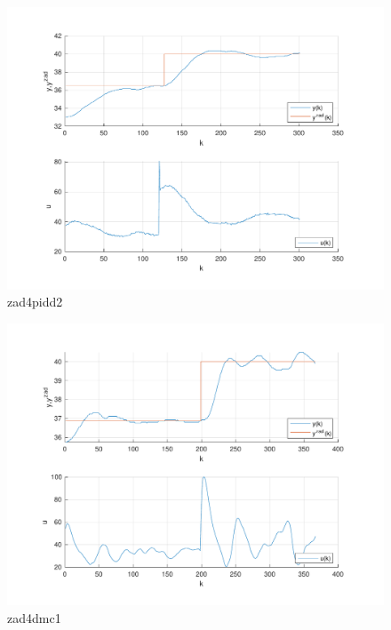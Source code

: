 \begin{figure}[H]
    \centering
    \includegraphics[scale=0.75]{../lab/zad_4/zad4pidd2.pdf}
    \caption{zad4pidd2}
\end{figure}

\begin{figure}[H]
    \centering
    \includegraphics[scale=0.75]{../lab/zad_4/zad4dmc1.pdf}
    \caption{zad4dmc1}
\end{figure}

